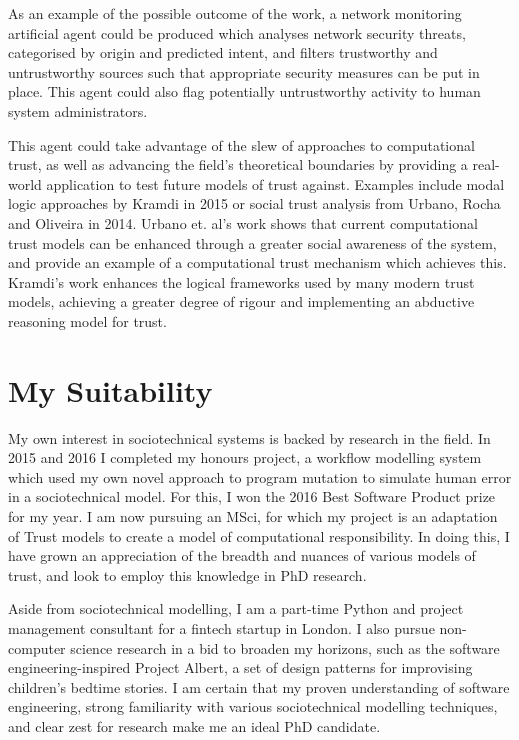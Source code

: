 \documentclass{tufte-handout}
\begin{document}
As an example of the possible outcome of the work, a network monitoring artificial agent could be produced which analyses network security threats, categorised by origin and predicted intent, and filters trustworthy and untrustworthy sources such that appropriate security measures can be put in place. This agent could also flag potentially untrustworthy activity to human system administrators.\par

This agent could take advantage of the slew of approaches to computational trust, as well as advancing the field's theoretical boundaries by providing a real-world application to test future models of trust against. Examples include modal logic approaches by Kramdi in 2015\cite{Kramdi} or social trust analysis from Urbano, Rocha and Oliveira in 2014\cite{Urbano2014}. Urbano et. al's work shows that current computational trust models can be enhanced through a greater social awareness of the system, and provide an example of a computational trust mechanism which achieves this. Kramdi's work enhances the logical frameworks used by many modern trust models, achieving a greater degree of rigour and implementing an abductive reasoning model for trust.\par

\section{My Suitability}
My own interest in sociotechnical systems is backed by research in the field. In 2015 and 2016 I completed my honours project, a workflow modelling system which used my own novel approach to program mutation to simulate human error in a sociotechnical model. For this, I won the 2016 Best Software Product prize for my year. I am now pursuing an MSci, for which my project is an adaptation of Trust models to create a model of computational responsibility. In doing this, I have grown an appreciation of the breadth and nuances of various models of trust, and look to employ this knowledge in PhD research.\par

Aside from sociotechnical modelling, I am a part-time Python and project management consultant for a fintech startup in London. I also pursue non-computer science research in a bid to broaden my horizons, such as the software engineering-inspired Project Albert, a set of design patterns for improvising children's bedtime stories. I am certain that my proven understanding of software engineering, strong familiarity with various sociotechnical modelling techniques, and clear zest for research make me an ideal PhD candidate.


\end{document}
